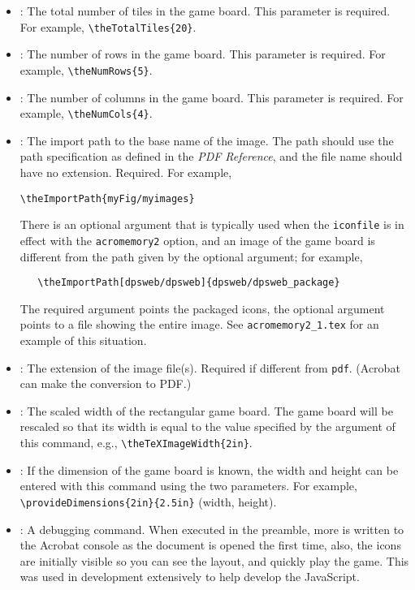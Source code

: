 \documentclass{article}
\begin{document}
\begin{itemize}
   \item {}: The total number of tiles in the game board. This parameter is required.
   For example, \verb!\theTotalTiles{20}!.
   \item {}: The number of rows in the game board. This parameter is required.
   For example, \verb!\theNumRows{5}!.
   \item {}: The number of columns in the game board.
   This parameter is required. For example, \verb!\theNumCols{4}!.
   \item {}: The import path to the base name of the image. The path
   should use the path specification as defined in the \emph{PDF Reference}, and the file name should
   have no extension. Required. For example,\smallskip
\begin{Verbatim}[xleftmargin=20pt,fontsize=\fontsize{9}{11}\selectfont]
\theImportPath{myFig/myimages}
\end{Verbatim}

   There is an optional argument that is typically used when the \texttt{iconfile} is in effect
   with the \texttt{acromemory2} option,  and an image of the game board is different from the
   path given by the optional argument; for example,
\begin{verbatim}
   \theImportPath[dpsweb/dpsweb]{dpsweb/dpsweb_package}
\end{verbatim}
   The required argument points the packaged icons, the optional argument points to
   a file showing the entire image. See \texttt{acromemory2\_1.tex} for an
   example of this situation.
   \item {}: The extension of the image file(s). Required if different
   from \texttt{pdf}. (Acrobat can make the conversion to PDF.)
   \item {}: The scaled width of the rectangular game board. The
   game board will be rescaled so that its width is equal to the value specified
   by the argument of this command, e.g., \verb!\theTeXImageWidth{2in}!.
   \item{}: If the dimension of the game board is known, the width
   and height can be entered with this command using the two parameters. For example,
   \verb!\provideDimensions{2in}{2.5in}! (width, height).
\item {}: A debugging command. When executed in the
    preamble, more is written to the Acrobat console as the document is
    opened the first time, also, the icons are initially visible so you
    can see the layout, and quickly play the game. This was used in
    development extensively to help develop the JavaScript.

\end{itemize}
\end{document}
